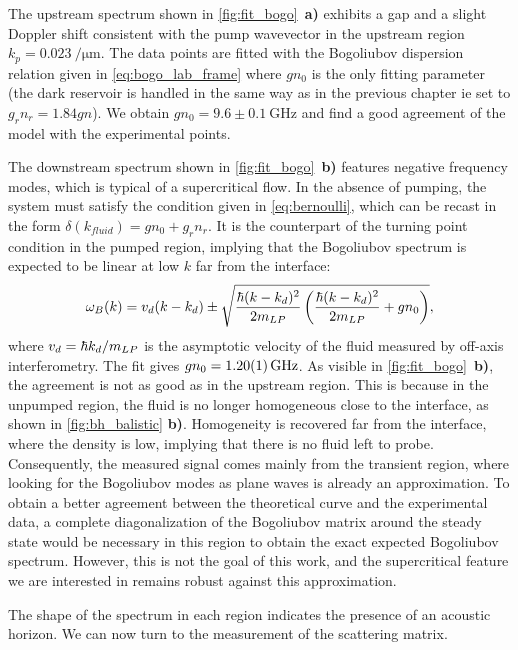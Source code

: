 The upstream spectrum shown in \autoref{fig:fit_bogo}~\textbf{a)} exhibits a gap and a slight Doppler shift consistent with the pump wavevector in the upstream region $k_p=\SI{0.023}{\per \micro \meter}$. The data points are fitted with the Bogoliubov dispersion relation given in \autoref{eq:bogo_lab_frame} where $gn_0$ is the only fitting parameter (the dark reservoir
is handled in the same way as in the previous chapter ie set to $g_rn_r=1.84gn$). 
We obtain $gn_0=9.6\pm\SI{0.1}{\giga \hertz}$ and find a good agreement of the model with the experimental points.

The downstream spectrum shown in \autoref{fig:fit_bogo}~\textbf{b)} features negative frequency modes, which is typical of a supercritical flow.
In the absence of pumping, the system must satisfy the condition given in \autoref{eq:bernoulli}, which can be recast in the form $\delta(k_{fluid})=gn_0+g_rn_r$. It is the counterpart of the turning point condition in the pumped region, implying that the Bogoliubov spectrum is expected to be linear at low $k$ far from the interface:
\begin{equation}
    \omega_B(k) = v_d(k-k_d) \pm \sqrt{\dfrac{\hbar (k-k_d)^2}{2m_{LP}} \left({\dfrac{\hbar (k-k_d)^2}{2m_{LP}}} + g n_0 \right)},
\end{equation}
where $v_d = \hbar k_d/m_{LP}$ is the asymptotic velocity of the fluid measured by off-axis interferometry. The fit gives $gn_0=\SI{1.2 \pm 0.01}{\giga \hertz}$. As visible in \autoref{fig:fit_bogo}~\textbf{b)}, the agreement is not as good as in the upstream region. 
This is because in the unpumped region, the fluid is no longer homogeneous close to the interface, as shown in \autoref{fig:bh_balistic} \textbf{b)}.
Homogeneity is recovered far from the interface, where the density is low, implying that there is no fluid left to probe.
Consequently, the measured signal comes mainly from the transient region, where looking for the Bogoliubov modes as plane waves is already an approximation.
To obtain a better agreement between the theoretical curve and the experimental data, a complete diagonalization of the Bogoliubov matrix around the steady state would be necessary in this region to obtain the exact expected Bogoliubov spectrum. However, this is not the goal of this work, and the supercritical feature we are interested in
remains robust against this approximation.

The shape of the spectrum in each region indicates the presence of an acoustic horizon.
We can now turn to the measurement of the scattering matrix.

